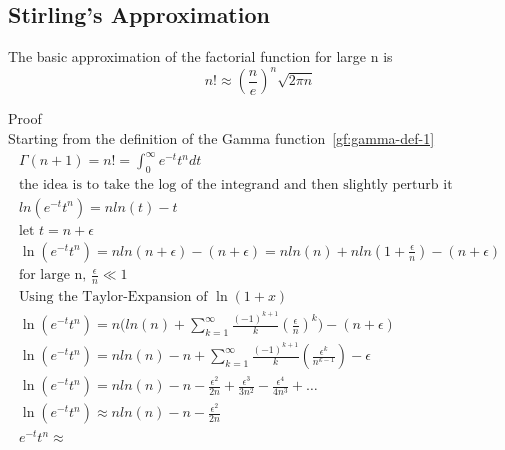 \documentclass[a4paper]{article}
\begin{document}
    \subsection{Stirling's Approximation}\label{gf:subsec:stirling's-approximation}
    \begin{theorem}
        The basic approximation of the factorial function for large n is
        \begin{equation}
            \boxed{
                n! \approx (\frac{n}{e})^n \sqrt{2\pi n}
            }\label{gf:eq:equation27}
        \end{equation}

        Proof
        \\
        Starting from the definition of the Gamma function~\ref{gf:gamma-def-1}
        \begin{gather*}
            \Gamma(n+1) = n! = \int_{0}^{\infty} e^{-t} t^{n} dt
            \\
            \text{the idea is to take the log of the integrand and then slightly perturb it}
            \\
            ln(e^{-t} t^{n}) = n ln(t) - t
            \\
            \text{let $t=n + \epsilon$}
            \\
            \ln(e^{-t} t^{n}) = n ln(n + \epsilon) - (n + \epsilon)
            =
            n ln(n) + n ln(1 + \frac{\epsilon}{n}) - (n + \epsilon)
            \\
            \text{for large n, $\frac{\epsilon}{n} \ll 1$}
            \\
            \text{Using the Taylor-Expansion of $\ln(1+x)$}
            \\
            \ln(e^{-t} t^{n})
            =
            n \Big( ln(n) +  \sum_{k=1}^{\infty} \frac{(-1)^{k+1}}{k} (\frac{\epsilon}{n})^k \Big) - (n + \epsilon)
            \\
            \ln(e^{-t} t^{n})
            =
            n ln(n) -n + \sum_{k=1}^{\infty} \frac{(-1)^{k+1}}{k} (\frac{\epsilon^k}{n^{k-1}}) - \epsilon
            \\
            \ln(e^{-t} t^{n})
            =
            n ln(n) - n - \frac{\epsilon^2}{2n} + \frac{\epsilon^3}{3n^2}
            - \frac{\epsilon^4}{4n^3} + \dots
            \\
            \ln(e^{-t} t^{n})
            \approx
            n ln(n) - n - \frac{\epsilon^2}{2n}
            \\
            e^{-t} t^{n}
            \approx

\end{gather*}
\end{theorem}
\end{document}
